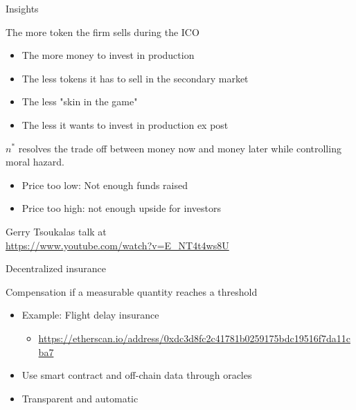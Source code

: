 \documentclass{beamer}
\begin{document}
\begin{frame}{Insights}
\scriptsize
\begin{tcolorbox}[enhanced,drop shadow, title=Optimal number of tokens sold $n^\ast$ ]

The more token the firm sells during the ICO
\begin{itemize}
  \item The more money to invest in production
  \item The less tokens it has to sell in the secondary market
  \item The less "skin in the game"
  \item The less it wants to invest in production ex post
\end{itemize}
$n^\ast$ resolves the trade off between money now and money later while controlling moral hazard.
\end{tcolorbox}
\begin{tcolorbox}[enhanced,drop shadow, title=Optimal token price $\tau^\ast$ ]


\begin{itemize}
  \item Price too low: Not enough funds raised
  \item Price too high: not enough upside for investors
\end{itemize} 
\end{tcolorbox}
Gerry Tsoukalas talk at \\
\url{https://www.youtube.com/watch?v=E_NT4t4ws8U}
\end{frame}
\begin{frame}{Decentralized insurance}
\begin{tcolorbox}[enhanced,drop shadow, title=Parametric insurance]
    Compensation if a measurable quantity reaches a threshold 
\end{tcolorbox}
\begin{itemize}
  \item Example: Flight delay insurance
  \begin{itemize}
    \item \url{https://etherscan.io/address/0xdc3d8fc2c41781b0259175bdc19516f7da11cba7}
  \end{itemize}
  \item Use smart contract and off-chain data through oracles
  \item Transparent and automatic
\end{itemize}
\end{frame}


% 
% 
\end{document}
